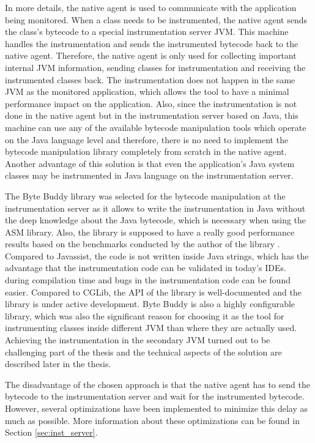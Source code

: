 In more details, the native agent is used to communicate with the application being monitored. When a class needs to be instrumented, the native agent sends the class's bytecode to a special instrumentation server JVM. This machine handles the instrumentation and sends the instrumented bytecode back to the native agent. Therefore, the native agent is only used for collecting important internal JVM information, sending classes for instrumentation and receiving the instrumented classes back. The instrumentation does not happen in the same JVM as the monitored application, which allows the tool to have a minimal performance impact on the application. Also, since the instrumentation is not done in the native agent but in the instrumentation server based on Java, this machine can use any of the available bytecode manipulation tools which operate on the Java language level and therefore, there is no need to implement the bytecode manipulation library completely from scratch in the native agent. Another advantage of this solution is that even the application's Java system classes may be instrumented in Java language on the instrumentation server.

The Byte Buddy library was selected for the bytecode manipulation at the instrumentation server as it allows to write the instrumentation in Java without the deep knowledge about the Java bytecode, which is necessary when using the ASM library. Also, the library is supposed to have a really good performance results based on the benchmarks conducted by the author of the library \cite{ByteBuddy_Perf}. Compared to Javassist, the code is not written inside Java strings, which has the advantage that the instrumentation code can be validated in today's IDEs. during compilation time and bugs in the instrumentation code can be found easier. Compared to CGLib, the API of the library is well-documented and the library is under active development. Byte Buddy is also a highly configurable library, which was also the significant reason for choosing it as the tool for instrumenting classes inside different JVM than where they are actually used. Achieving the instrumentation in the secondary JVM  turned out to be challenging part of the thesis and the technical aspects of the solution are described later in the thesis.

The disadvantage of the chosen approach is that the native agent has to send the bytecode to the instrumentation server and wait for the instrumented bytecode. However, several optimizations have been implemented to minimize this delay as much as possible. More information about these optimizations can be found in Section \ref{sec:inst_server}.
			

